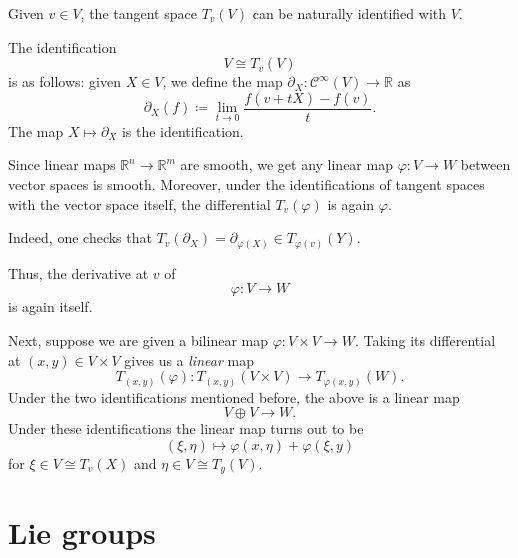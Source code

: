 \documentclass[12pt]{article}
\begin{document}
Given $v \in V$, the tangent space $T_{v}(V)$ can be naturally identified with $V$.

\begin{rem}
	The identification 
	\begin{equation*} 
		V \cong T_{v}(V)
	\end{equation*}
	is as follows: given $X \in V$, we define the map $\partial_{X} \colon \mathcal{C}^{\infty}(V) \to \mathbb{R}$ as
	\begin{equation*} 
		\partial_{X}(f) \coloneqq \lim_{t \to 0} \frac{f(v + tX) - f(v)}{t}.
	\end{equation*}
	The map $X \mapsto \partial_{X}$ is the identification.
\end{rem}

Since linear maps $\mathbb{R}^{n} \to \mathbb{R}^{m}$ are smooth, we get any linear map $\varphi \colon V \to W$ between vector spaces is smooth. 
Moreover, under the identifications of tangent spaces with the vector space itself, the differential $T_{v}(\varphi)$ is again $\varphi$. 

Indeed, one checks that $T_{v}(\partial_{X}) = \partial_{\varphi(X)} \in T_{\varphi(v)}(Y)$.

Thus, the derivative at $v$ of
\begin{equation*} 
	\varphi \colon V \to W
\end{equation*}
is again itself.

Next, suppose we are given a bilinear map $\varphi \colon V \times V \to W$. 
Taking its differential at $(x, y) \in V \times V$ gives us a \emph{linear} map
\begin{equation*} 
	T_{(x, y)}(\varphi) \colon T_{(x, y)}(V \times V) \to T_{\varphi(x, y)}(W).
\end{equation*}
Under the two identifications mentioned before, the above is a linear map
\begin{equation*} 
	V \oplus V \to W.
\end{equation*}
Under these identifications the linear map turns out to be
\begin{equation} \label{eq:product-rule-bilinear-map}
	(\xi, \eta) \mapsto \varphi(x, \eta) + \varphi(\xi, y)
\end{equation}
for $\xi \in V \cong T_{v}(X)$ and $\eta \in V \cong T_{y}(V)$.

\section{Lie groups}
\end{document}

